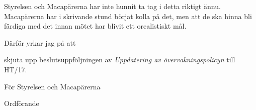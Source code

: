 \documentclass[../_main/handlingar.tex]{subfiles}
\begin{document}

Styrelsen och Macapärerna har inte hunnit ta tag i detta riktigt ännu. Macapärerna har i skrivande stund börjat kolla på det, men att de ska hinna bli färdiga med det innan mötet har blivit ett orealistiskt mål.

Därför yrkar jag på att

\begin{attsatser}
    \att skjuta upp beslutsuppföljningen av \emph{Uppdatering av övervakningspolicyn} till HT/17.
\end{attsatser}

\begin{signatures}{1}
    För Styrelsen och Macapärerna
    \signature{Erik Månsson}{Ordförande}
\end{signatures}
\end{document}
